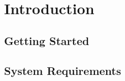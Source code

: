 \documentclass{article}
\begin{document}
\section{Introduction}
\begin{center}

\section{Getting Started}
\subsection{System Requirements}


\end{center}
\end{document}
